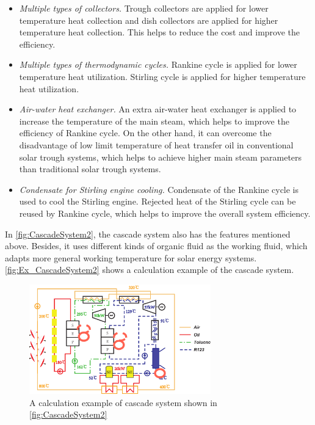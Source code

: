 \begin{itemize}
  \item \emph{Multiple types of collectors.} Trough collectors are applied for lower temperature heat collection and dish collectors are applied for higher temperature heat collection. This helps to reduce the cost and improve the efficiency.
  \item \emph{Multiple types of thermodynamic cycles.} Rankine cycle is applied for lower temperature heat utilization. Stirling cycle is applied for higher temperature heat utilization.
  \item \emph{Air-water heat exchanger.} An extra air-water heat exchanger is applied to increase the temperature of the main steam, which helps to improve the efficiency of Rankine cycle. On the other hand, it can overcome the disadvantage of low limit temperature of heat transfer oil in conventional solar trough systems, which helps to achieve higher main steam parameters than traditional solar trough systems. 
  \item \emph{Condensate for Stirling engine cooling.} Condensate of the Rankine cycle is used to cool the Stirling engine. Rejected heat of the Stirling cycle can be reused by Rankine cycle, which helps to improve the overall system efficiency.
\end{itemize}

In \autoref{fig:CascadeSystem2}, the cascade system also has the features mentioned above. Besides, it uses different kinds of organic fluid as the working fluid, which adapts more general working temperature for solar energy systems. \autoref{fig:Ex_CascadeSystem2} shows a calculation example of the cascade system.

\begin{figure}[!ht]
\centering 
\includegraphics[width=0.7\textwidth]{fig/Ex_CascadeSystem2}
\caption{A calculation example of cascade system shown in \autoref{fig:CascadeSystem2}}
\label{fig:Ex_CascadeSystem2}
\end{figure}

